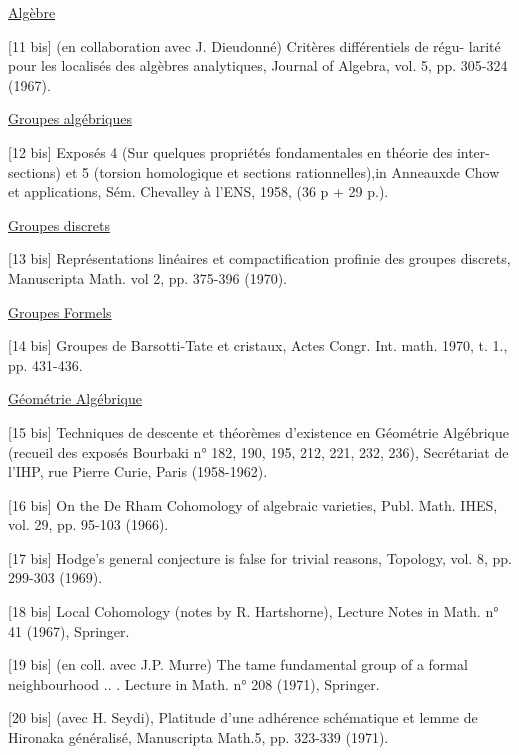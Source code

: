 
\uline{Algèbre}

[11 bis] (en collaboration avec J. Dieudonné) Critères différentiels de régu-%
larité pour les localisés des algèbres analytiques, Journal of Algebra,
vol. 5, pp. 305-324 (1967).

\uline{Groupes algébriques}

[12 bis] Exposés 4 (Sur quelques propriétés fondamentales en théorie des inter-%
sections) et 5 (torsion homologique et sections rationnelles),in
Anneauxde Chow et applications, Sém. Chevalley à l'ENS, 1958, (36 p +
29 p.).

\uline{Groupes discrets}

[13 bis] Représentations linéaires et compactification profinie des groupes
discrets, Manuscripta Math. vol 2, pp. 375-396 (1970).

\uline{Groupes Formels}

[14 bis] Groupes de Barsotti-Tate et cristaux, Actes Congr. Int. math. 1970,
t. 1., pp. 431-436.

\uline{Géométrie Algébrique}

[15 bis] Techniques de descente et théorèmes d'existence en Géométrie Algébrique
(recueil des exposés Bourbaki n° 182, 190, 195, 212, 221, 232, 236),
Secrétariat de l'IHP, rue Pierre Curie, Paris (1958-1962).

[16 bis] On the De Rham Cohomology of algebraic varieties, Publ. Math. IHES,
vol. 29, pp. 95-103 (1966).

[17 bis] Hodge's general conjecture is false for trivial reasons, Topology,
vol. 8, pp. 299-303 (1969).

[18 bis] Local Cohomology (notes by R. Hartshorne), Lecture Notes in Math.
n° 41 (1967), Springer.

[19 bis] (en coll. avec J.P. Murre) The tame fundamental group of a formal
neighbourhood .. . Lecture  in Math. n° 208 (1971), Springer.

[20 bis] (avec H. Seydi), Platitude d'une adhérence schématique et lemme de
Hironaka généralisé, Manuscripta Math.5, pp. 323-339 (1971).

